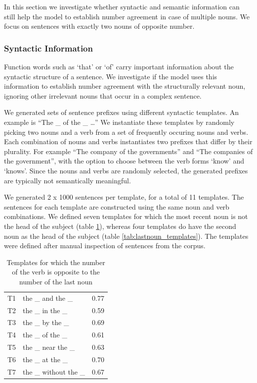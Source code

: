 In this section we investigate whether
syntactic and semantic information
can still help the model 
to establish number agreement
in case of multiple nouns.
We focus on sentences with exactly two nouns
of opposite number.


\subsubsection{Syntactic Information}

Function words such as `that' or `of' carry 
important information about the syntactic structure of a sentence.
We investigate if the model
uses this information to establish number agreement
with the structurally relevant noun, ignoring
other irrelevant nouns that occur in a complex sentence.

We generated sets of sentence prefixes using 
different syntactic templates.
An example is ``The \_ of the \_ \ldots''
We instantiate these templates by randomly
picking two nouns and a verb 
from a set of frequently occuring nouns and verbs. 
Each combination of nouns and verbs instantiates
two prefixes that differ by their plurality.
For example ``The company of the governments''
and ``The companies of the government'',
with the option to choose between the verb forms
`know' and `knows'.
Since the nouns and verbs are randomly selected,
the generated prefixes 
are typically not semantically
meaningful.

We generated 2 x 1000 sentences per template,
for a total of 11 templates.
The sentences for each template are constructed using the same
noun and verb combinations.
We defined seven templates for which the most recent noun is 
not the head of the subject (table \ref{tab:attractor_templates}),
whereas four templates do have the second noun as the head of the subject
(table \ref{tab:lastnoun_templates}).
The templates were defined after manual inspection
of sentences from the corpus.

\begin{table}
\parbox{\linewidth}{
\centering
\begin{tabular}{ l l r }
  T1    & the \_ and the \_     &  0.77 \\
  T2    & the \_ in the \_      &  0.59 \\
  T3    & the \_ by the \_      &  0.69 \\
  T4    & the \_ of the \_      &  0.61 \\
  T5    & the \_ near the \_    &  0.63\\
  T6    & the \_ at the \_      &  0.70\\
  T7    & the \_ without the \_ & 0.67  \\
\end{tabular}
\caption{Templates for which the number of the verb 
is opposite to the number of the last noun} 
\label{tab:attractor_templates}
}
\end{table}


